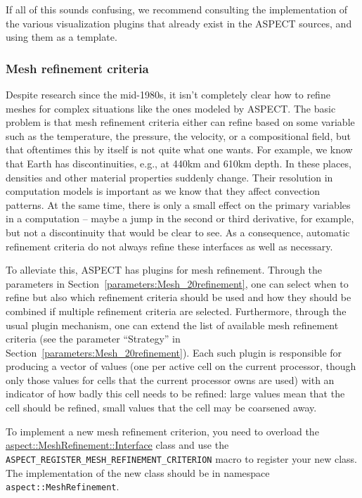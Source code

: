 \documentclass{article}
\newcommand{\aspect}{\textsc{ASPECT}}
\begin{document}
If all of this sounds confusing, we recommend consulting the implementation of
the various visualization plugins that already exist in the \aspect{} sources,
and using them as a template.


\subsubsection{Mesh refinement criteria}
\label{sec:mesh-refinement-criteria}


Despite research since the mid-1980s, it isn't completely clear how to refine
meshes for complex situations like the ones modeled by \aspect{}. The basic
problem is that mesh refinement criteria either can refine based on some
variable such as the temperature, the pressure, the velocity, or a compositional
field, but that oftentimes this by itself is not quite what one wants. For
example, we know that Earth has discontinuities, e.g., at 440km and 610km depth.
In these places, densities and other material properties suddenly change. Their
resolution in computation models is important as we know that they affect
convection patterns. At the same time, there is only a small effect on the
primary variables in a computation -- maybe a jump in the second or third
derivative, for example, but not a discontinuity that would be clear to see. As
a consequence, automatic refinement criteria do not always refine these
interfaces as well as necessary.

To alleviate this, \aspect{} has plugins for mesh refinement. Through the
parameters in Section~\ref{parameters:Mesh_20refinement}, one can select when to
refine but also which refinement criteria should be used and how they should be
combined if multiple refinement criteria are selected. Furthermore, through the
usual plugin mechanism, one can extend the list of available mesh refinement
criteria (see the parameter ``Strategy'' in
Section~\ref{parameters:Mesh_20refinement}).
Each such plugin is responsible for producing a vector of values (one per
active cell on the current processor, though only those values for cells that
the current processor owns are used) with an indicator of how badly this cell
needs to be refined: large values mean that the cell should be refined, small
values that the cell may be coarsened away.

To implement a new mesh refinement criterion, you
need to overload the
\href{doc/doxygen/classaspect_1_1MeshRefinement_1_1Interface.html}{aspect::MeshRefinement::Interface}
class and use
the \texttt{ASPECT\_REGISTER\_MESH\_REFINEMENT\_CRITERION} macro to register
your new class. The implementation of the new class should be in namespace
\texttt{aspect::MeshRefinement}.
\end{document}
